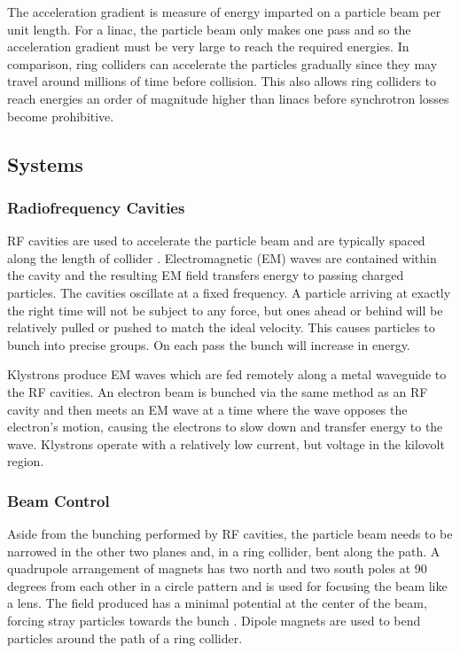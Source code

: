  The acceleration gradient is measure of energy imparted on a particle beam per unit length. For a linac, the particle beam only makes one pass and so the acceleration gradient must be very large to reach the required energies. In comparison, ring colliders can accelerate the particles gradually since they may travel around millions of time before collision. This also allows ring colliders to reach energies an order of magnitude higher than linacs before synchrotron losses become prohibitive.
 
 \subsection{Systems}
 \subsubsection{Radiofrequency Cavities}
 
 RF cavities are used to accelerate the particle beam and are typically spaced along the length of collider \cite{CERN:RFCAV}. Electromagnetic (EM) waves 
are contained within the cavity and the resulting EM field transfers energy to passing charged particles. The cavities oscillate at a fixed frequency. A particle arriving at exactly the right time will not be subject to any force, but ones ahead or behind will be relatively pulled or pushed to match the ideal velocity. This causes particles to bunch into precise groups. On each pass the bunch will increase in energy.

Klystrons produce EM waves which are fed remotely along a metal waveguide to the RF cavities. An electron beam is bunched via the same method as an RF cavity and then meets an EM wave at a time where the wave opposes the electron's motion, causing the electrons to slow down and transfer energy to the wave. Klystrons operate with a relatively low current, but voltage in the kilovolt region.
 
 \subsubsection{Beam Control}
 
 Aside from the bunching performed by RF cavities, the particle beam needs to be narrowed in the other two planes and, in a ring collider, bent along the path. A quadrupole arrangement of magnets has two north and two south poles at 90 degrees from each other in a circle pattern and is used for focusing the beam like a lens. The field produced has a minimal potential at the center of the beam, forcing stray particles towards the bunch \cite{ILC:BeamFocusing}. Dipole magnets are used to bend particles around the path of a ring collider. 
 
